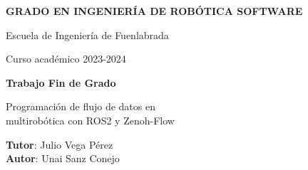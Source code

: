 \thispagestyle{empty}
\vspace{2cm}

\begin{figure}[htb]
  \centerline{}
\end{figure}

\begin{center}
  {\Large {\bf GRADO EN INGENIERÍA DE ROBÓTICA SOFTWARE}}
  \vspace{5mm}
 
  {\large {Escuela de Ingeniería de Fuenlabrada}}
  \vspace{5mm}

  {\large {Curso académico 2023-2024}}

  \vspace{1cm}

  {\large {\bf Trabajo Fin de Grado}}

  \vspace{2cm}

  {\Large { Programación de flujo de datos en\\
            multirobótica con ROS2 y Zenoh-Flow\\[1cm] }}

  \vspace{5cm}
  {\bf Tutor}: Julio Vega Pérez \\
  {\bf Autor}: Unai Sanz Conejo
\end{center}

\clearpage
\thispagestyle{empty}
